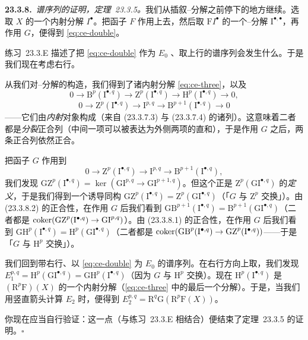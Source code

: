 \textbf{23.3.8.}\ \emph{\trGrothendieck{}谱序列的证明，\mbox{定理~23.3.5}。}\quad 我们从插叙\trCartan--\trEilenberg{}分解之前停下的地方继续。选取 $X$ 的一个内射分解 $I^\bullet$。把函子 $F$ 作用上去，然后取 $\mathrm{F}I^\bullet$ 的一个\trCartan--\trEilenberg{}分解 $\mathrm{I}^{\bullet,\bullet}$，再作用 $G$，便得到 \eqref{eq:ce-double}。

\mbox{练习~23.3.E} 描述了把 \eqref{eq:ce-double} 作为 $E_0$ \trPage{}、取上行\trOrientation{}的谱序列会发生什么。于是我们现在考虑右行\trOrientation。

从我们对\trCartan--\trEilenberg{}分解的构造，我们得到了诸内射分解 \eqref{eq:ce-three}，以及\trShortExactSequence
\[
\tag{23.3.8.1}\label{eq:ce-bzh}
0 \longrightarrow \mathrm{B}^p(\mathrm{I}^{\bullet,q}) \longrightarrow \mathrm{Z}^p(\mathrm{I}^{\bullet,q}) \longrightarrow \mathrm{H}^p(\mathrm{I}^{\bullet,q}) \longrightarrow 0,
\]
\[
\tag{23.3.8.2}\label{eq:ce-zib}
0 \longrightarrow \mathrm{Z}^p(\mathrm{I}^{\bullet,q}) \longrightarrow \mathrm{I}^{p,q} \longrightarrow \mathrm{B}^{p+1}(\mathrm{I}^{\bullet,q}) \longrightarrow 0
\]
——它们由\emph{内射}对象构成（来自 (23.3.7.3) 与 (23.3.7.4) 的诸列）。这意味着二者都是\emph{分裂}正合列（中间一项可以被表达为外侧两项的直和），于是作用 $G$ 之后，两条正合列依然正合。

把\trLeftExact{}函子 $G$ 作用到
\[
0 \longrightarrow \mathrm{Z}^p(\mathrm{I}^{\bullet,q}) \longrightarrow \mathrm{I}^{p,q} \longrightarrow \mathrm{B}^{p+1}(\mathrm{I}^{\bullet,q}),
\]
我们发现 $\mathrm{GZ}^p(\mathrm{I}^{\bullet,q})=\ker(\mathrm{GI}^{p,q}\to\mathrm{GI}^{p+1,q})$。但这个\trKernel{}正是 $\mathrm{Z}^p(\mathrm{GI}^{\bullet,q})$ 的\emph{定义}，于是我们得到一个诱导同构 $\mathrm{GZ}^p(\mathrm{I}^{\bullet,q})=\mathrm{Z}^p(\mathrm{GI}^{\bullet,q})$（「$G$ 与 $\mathrm{Z}^p$ 交换」）。由 (23.3.8.2) 的正合性，在作用 $G$ 后我们看到 $\mathrm{GB}^{p+1}(\mathrm{I}^{\bullet,q})=\mathrm{B}^{p+1}(\mathrm{GI}^{\bullet,q})$（二者都是 $\operatorname{coker}(\mathrm{GZ}^p(\mathrm{I}^{\bullet,q})\to\mathrm{GI}^{p,q})$）。由 (23.3.8.1) 的正合性，在作用 $G$ 后我们看到 $\mathrm{GH}^p(\mathrm{I}^{\bullet,q})=\mathrm{H}^p(\mathrm{GI}^{\bullet,q})$（二者都是 $\operatorname{coker}(\mathrm{GB}^p(\mathrm{I}^{\bullet,q})\to\mathrm{GZ}^p(\mathrm{I}^{\bullet,q}))$——于是「$G$ 与 $\mathrm{H}^p$ 交换」）。

我们回到带右行\trOrientation{}、以 \eqref{eq:ce-double} 为 $E_0$ \trPage{}的谱序列。在右行方向上取\trCohomology，我们发现 $E_1^{p,q}=\mathrm{H}^p(\mathrm{GI}^{\bullet,q})=\mathrm{GH}^p(\mathrm{I}^{\bullet,q})$（因为 $G$ 与 $\mathrm{H}^p$ 交换）。现在 $\mathrm{H}^p(\mathrm{I}^{\bullet,q})$ 是 $(\mathrm{R}^p\mathrm{F})(X)$ 的一个内射分解（\eqref{eq:ce-three} 中的最后一个分解）。于是，当我们用竖直箭头计算 $E_2$ 时，便得到 $E_2^{p,q}=\mathrm{R}^q\mathrm{G}(\mathrm{R}^p\mathrm{F}(X))$。

你现在应当自行验证：这一点（与\mbox{练习~23.3.E} 相结合）便结束了\mbox{定理~23.3.5} 的证明。\hfill$\square$


